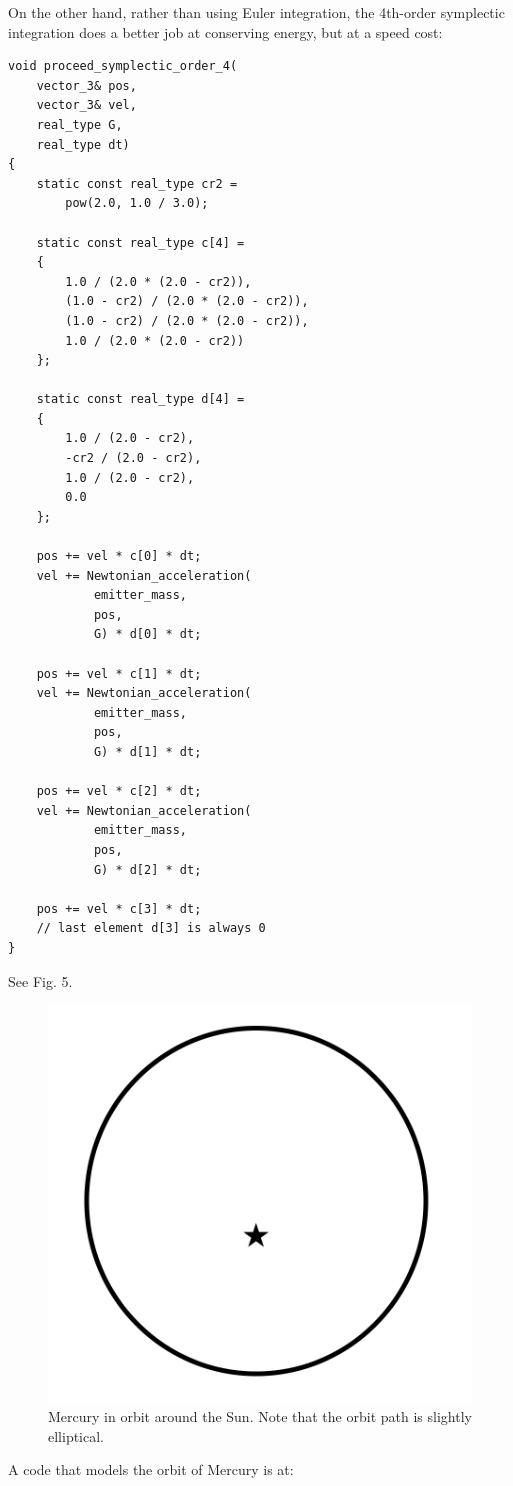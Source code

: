 \documentclass[12pt]{article}
\begin{document}
On the other hand, rather than using Euler integration, the 4th-order symplectic integration does a better job at conserving energy, but at a speed cost:
\begin{lstlisting}
void proceed_symplectic_order_4(
	vector_3& pos, 
	vector_3& vel, 
	real_type G, 
	real_type dt)
{
	static const real_type cr2 = 
		pow(2.0, 1.0 / 3.0);

	static const real_type c[4] =
	{
		1.0 / (2.0 * (2.0 - cr2)),
		(1.0 - cr2) / (2.0 * (2.0 - cr2)),
		(1.0 - cr2) / (2.0 * (2.0 - cr2)),
		1.0 / (2.0 * (2.0 - cr2))
	};

	static const real_type d[4] =
	{
		1.0 / (2.0 - cr2),
		-cr2 / (2.0 - cr2),
		1.0 / (2.0 - cr2),
		0.0
	};

	pos += vel * c[0] * dt;
	vel += Newtonian_acceleration(
			emitter_mass, 
			pos, 
			G) * d[0] * dt;

	pos += vel * c[1] * dt;
	vel += Newtonian_acceleration(
			emitter_mass, 
			pos, 
			G) * d[1] * dt;

	pos += vel * c[2] * dt;
	vel += Newtonian_acceleration(
			emitter_mass, 
			pos, 
			G) * d[2] * dt;

	pos += vel * c[3] * dt;
	// last element d[3] is always 0
}
\end{lstlisting}

See Fig. 5.
\begin{figure} 
\centering
  \includegraphics[width = 4 in]{mercury.png}
  \caption{
Mercury in orbit around the Sun.
Note that the orbit path is slightly elliptical.
}
\end{figure}

A code that models the orbit of Mercury is at:
\end{document}
